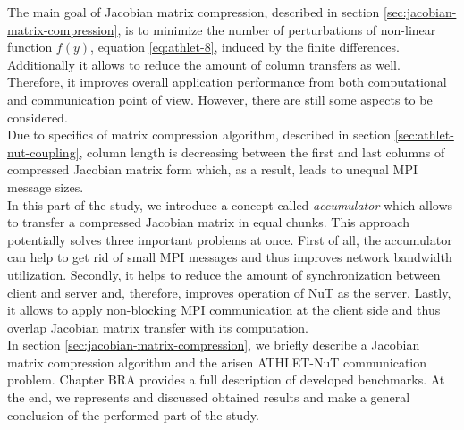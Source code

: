 The main goal of Jacobian matrix compression, described in section \ref{sec:jacobian-matrix-compression}, is to minimize the number of perturbations of non-linear function $f(y)$, equation \ref{eq:athlet-8}, induced by the finite differences. Additionally it allows to reduce the amount of column transfers as well. Therefore, it improves overall application performance from both computational and communication point of view. However, there are still some aspects to be considered.\\


Due to specifics of matrix compression algorithm, described in section \ref{sec:athlet-nut-coupling}, column length is decreasing between the first and last columns of compressed Jacobian matrix form which, as a result, leads to unequal MPI message sizes.\\


In this part of the study, we introduce a concept called \textit{accumulator} which allows to transfer a compressed Jacobian matrix in equal chunks. This approach potentially solves three important problems at once. First of all, the accumulator can help to get rid of small MPI messages and thus improves network bandwidth utilization. Secondly, it helps to reduce the amount of synchronization between client and server and, therefore, improves operation of NuT as the server. Lastly, it allows to apply non-blocking MPI communication at the client side and thus overlap Jacobian matrix transfer with its computation.\\


In section \ref{sec:jacobian-matrix-compression}, we briefly describe a Jacobian matrix compression algorithm and the arisen ATHLET-NuT communication problem. Chapter BRA provides a full description of developed benchmarks. At the end, we represents and discussed obtained results and make a general conclusion of the performed part of the study.\\


